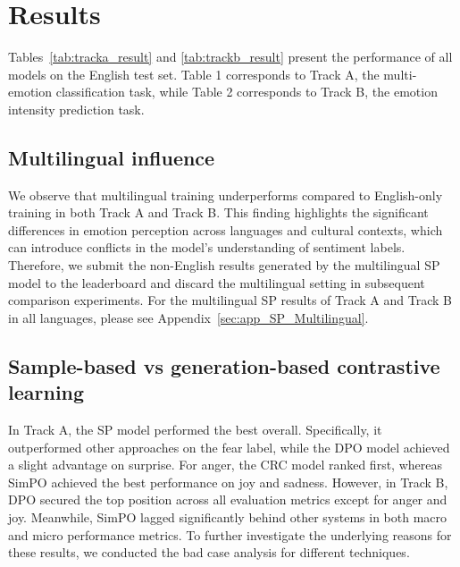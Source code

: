 \documentclass[11pt]{article}
\begin{document}
\section{Results}


Tables~\ref{tab:tracka_result} and \ref{tab:trackb_result} present the performance of all models on the English test set. Table 1 corresponds to Track A, the multi-emotion classification task, while Table 2 corresponds to Track B, the emotion intensity prediction task.

\subsection{Multilingual influence}


We observe that multilingual training underperforms compared to English-only training in both Track A and Track B. This finding highlights the significant differences in emotion perception across languages and cultural contexts, which can introduce conflicts in the model’s understanding of sentiment labels. Therefore, we submit the non-English results generated by the multilingual SP model to the leaderboard and discard the multilingual setting in subsequent comparison experiments. For the multilingual SP results of Track A and Track B in all languages, please see Appendix~\ref{sec:app_SP_Multilingual}.

\subsection{Sample-based vs generation-based contrastive learning}


In Track A, the SP model performed the best overall. Specifically, it outperformed other approaches on the fear label, while the DPO model achieved a slight advantage on surprise. For anger, the CRC model ranked first, whereas SimPO achieved the best performance on joy and sadness. However, in Track B, DPO secured the top position across all evaluation metrics except for anger and joy. Meanwhile, SimPO lagged significantly behind other systems in both macro and micro performance metrics. To further investigate the underlying reasons for these results, we conducted the bad case analysis for different techniques.
\end{document}

